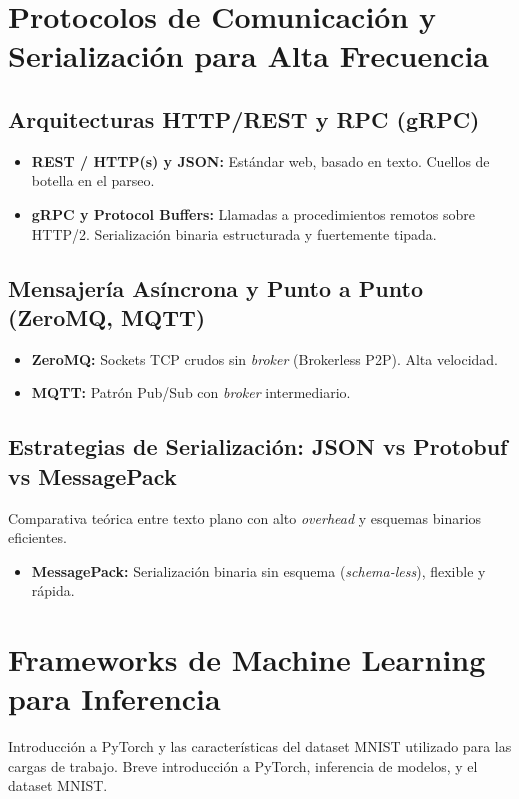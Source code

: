 \documentclass[11pt, a4paper]{report}
\begin{document}
\section{Protocolos de Comunicación y Serialización para Alta Frecuencia}
\subsection{Arquitecturas HTTP/REST y RPC (gRPC)}
\begin{itemize}
    \item \textbf{REST / HTTP(s) y JSON:} Estándar web, basado en texto. Cuellos de botella en el parseo.
    \item \textbf{gRPC y Protocol Buffers:} Llamadas a procedimientos remotos sobre HTTP/2. Serialización binaria estructurada y fuertemente tipada.
\end{itemize}

\subsection{Mensajería Asíncrona y Punto a Punto (ZeroMQ, MQTT)}
\begin{itemize}
    \item \textbf{ZeroMQ:} Sockets TCP crudos sin \textit{broker} (Brokerless P2P). Alta velocidad.
    \item \textbf{MQTT:} Patrón Pub/Sub con \textit{broker} intermediario.
\end{itemize}

\subsection{Estrategias de Serialización: JSON vs Protobuf vs MessagePack}
Comparativa teórica entre texto plano con alto \textit{overhead} y esquemas binarios eficientes.
\begin{itemize}
    \item \textbf{MessagePack:} Serialización binaria sin esquema (\textit{schema-less}), flexible y rápida.
\end{itemize}

\section{Frameworks de Machine Learning para Inferencia}
Introducción a PyTorch y las características del dataset MNIST utilizado para las cargas de trabajo. Breve introducción a PyTorch, inferencia de modelos, y el dataset MNIST.
\end{document}
